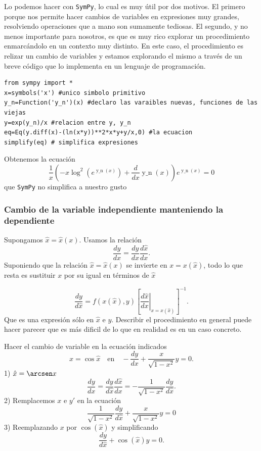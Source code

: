 Lo podemos hacer con \texttt{SymPy}, lo cual es muy útil por dos motivos. El primero porque nos permite hacer cambios de variables en expresiones muy grandes, resolviendo operaciones que a mano son sumamente tediosas. El segundo, y no menos importante para nosotros, es que es muy rico explorar un procedimiento enmarcándolo en un contexto muy distinto. En este caso, el procedimiento es relizar un cambio de variables y estamos explorando el mismo a través de un breve código que lo implementa en un lenguaje de programación.

\begin{lstlisting}
from sympy import *
x=symbols('x') #unico simbolo primitivo
y_n=Function('y_n')(x) #declaro las varaibles nuevas, funciones de las viejas
y=exp(y_n)/x #relacion entre y, y_n
eq=Eq(y.diff(x)-(ln(x*y))**2*x*y+y/x,0) #la ecuacion
simplify(eq) # simplifica expresiones
\end{lstlisting}
Obtenemos la ecuación
\[\frac{1}{x} \left(- x \log^{2}{\left (e^{\operatorname{y\_n}{\left (x \right )
}} \right )} + \frac{d}{d x} \operatorname{y\_n}{\left (x \right )}\right) e^{
\operatorname{y\_n}{\left (x \right )}} = 0\]
que \texttt{SymPy} no simplifica a nuestro gusto




\subsubsection{Cambio de la variable independiente manteniendo la dependiente}

Supongamos  $\hat{x}=\hat{x}(x)$. Usamos la relación
\[\frac{dy}{dx}=\frac{dy}{d\hat{x}}\frac{d\hat{x}}{dx}.\]
Suponiendo que la relación $\hat{x}=\hat{x}(x)$ se invierte en $x=x(\hat{x})$, todo lo que resta es sustituir  $x$ por su igual en términos de $\hat{x}$

\[\frac{dy}{d\hat{x}}=f(x(\hat{x}),y) \left[\left.\frac{d\hat{x}}{dx}\right|_{x=x(\hat{x})}\right]^{-1}.\]
Que es una expresión sólo en $\hat{x}$ e $y$. Describir el procedimiento  en general puede hacer parecer que es más dificil de lo que en realidad es en un caso concreto.



\begin{ejemplo} Hacer el cambio de variable en la  ecuación indicados
\[x=\cos \hat{x}\quad\text{en}\quad  -\frac{dy}{dx}+\frac{x}{\sqrt{1-x^2}}y=0.\]
1) $\hat{x}=\arcsen x$
\[\frac{dy}{dx}=\frac{dy}{d\hat{x}} \frac{d\hat{x}}{dx}  =-\frac{1}{\sqrt{1-x^2}}\frac{dy}{d\hat{x}}.\]
 2) Remplacemos $x$ e $y'$ en la ecuación
\[\frac{1}{\sqrt{1-x^2}}\frac{dy}{d\hat{x}}+ \frac{x}{\sqrt{1-x^2}}y=0\]
3) Reemplazando $x$ por $\cos(\hat{x})$ y simplificando
\[\frac{dy}{d\hat{x}}+\cos(\hat{x}) y=0.\]

\end{ejemplo}



